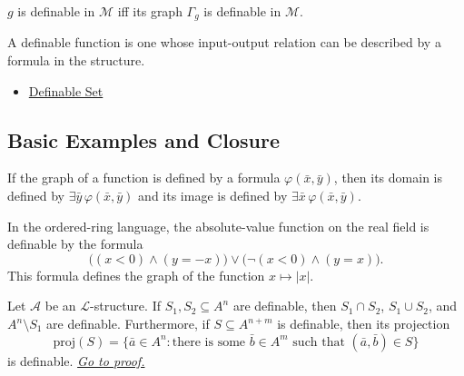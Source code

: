 \begin{remark*}
$g$ is definable in $\mathcal{M}$ iff its graph $\Gamma_g$ is definable in
$\mathcal{M}$.
\end{remark*}

\begin{remark*}[Interpretation]
A definable function is one whose input-output relation can be described by a
formula in the structure.
\end{remark*}

\begin{dependencies}
\begin{itemize}
  \item \hyperref[def:definable-set]{Definable Set}
\end{itemize}
\end{dependencies}

\subsection{Basic Examples and Closure}

\begin{remark*}
If the graph of a function is defined by a formula
$\varphi(\bar x,\bar y)$, then its domain is defined by
$\exists\bar y\,\varphi(\bar x,\bar y)$ and its image is defined by
$\exists\bar x\,\varphi(\bar x,\bar y)$.
\end{remark*}

\begin{example*}
In the ordered-ring language, the absolute-value function on the real field is
definable by the formula
\[
  \bigl((x<0)\land (y=-x)\bigr)
  \lor
  \bigl(\lnot(x<0)\land (y=x)\bigr).
\]
This formula defines the graph of the function $x\mapsto |x|$.
\end{example*}

\begin{lemma}\label{lem:closure-of-definable-sets}
Let $\mathcal{A}$ be an $\mathcal{L}$-structure. If
$S_1,S_2\subseteq A^n$ are definable, then
$S_1\cap S_2$, $S_1\cup S_2$, and $A^n\setminus S_1$ are definable.
Furthermore, if $S\subseteq A^{n+m}$ is definable, then its projection
\[
  \mathrm{proj}(S)
  =
  \{\bar a\in A^n : \text{there is some }\bar b\in A^m
      \text{ such that }(\bar a,\bar b)\in S\}
\]
is definable.
\hyperref[prf:closure-of-definable-sets]{\textit{Go to proof.}}
\end{lemma}

